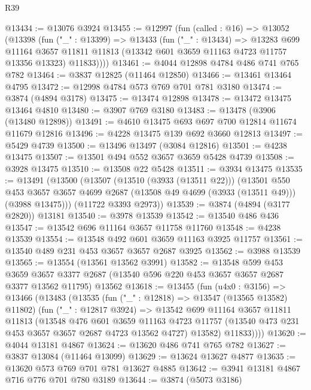 \begin{lexlean}{R39}
\begin{coremodule}
@13434 := @13076 @3924
@13455 := @12997
    (fun (called : @16) =>
    @13052
      (@13398
        (fun ("_" : @13399) =>
        @13433
          (fun ("_" : @13434) =>
          @13283
            @699
            @11164
            @3657
            @11811
            @11813
            (@13342 @601 @3659 @11163 @4723 @11757 @13356 @13323)
            @11833))))
@13461 := @4044 @12898 @4784 @486 @741 @765 @782
@13464 := @3837 @12825 (@11464 @12850)
@13466 := @13461 @13464 @4795
@13472 := @12998 @4784 @573 @769 @701 @781 @3180
@13474 := @3874 (@4894 @3178)
@13475 := @13474 @12898
@13478 := @13472 @13475 @13464 @4810
@13480 := @3907 @769 @3180
@13483 := @13478 (@3906 (@13480 @12898))
@13491 := @4610 @13475 @693 @697 @700 @12814 @11674 @11679 @12816
@13496 := @4228 @13475 @139 @692 @3660 @12813
@13497 := @5429 @4739
@13500 := @13496 @13497 (@3084 @12816)
@13501 := @4238 @13475
@13507 := @13501 @494 @552 @3657 @3659 @5428 @4739
@13508 := @3928 @13475
@13510 := @13508 @22 @5428
@13511 := @3934 @13475
@13535 := @13491
    (@13500
      (@13507
        (@13510 (@3933 (@13511 @22)))
        (@13501
          @550
          @453
          @3657
          @3657
          @4699
          @2687
          (@13508 @49 @4699 (@3933 (@13511 @49)))
          (@3988 @13475)))
      (@11722 @3393 @2973))
@13539 := @3874 (@4894 (@3177 @2820)) @13181
@13540 := @3978 @13539
@13542 := @13540 @486 @436
@13547 := @13542 @696 @11164 @3657 @11758 @11760
@13548 := @4238 @13539
@13554 := @13548 @492 @601 @3659 @11163 @3925 @11757
@13561 := @13540 @489 @231 @453 @3657 @3657 @2687 @3925
@13562 := @3988 @13539
@13565 := @13554 (@13561 @13562 @3991)
@13582 := @13548
    @599
    @453
    @3659
    @3657
    @3377
    @2687
    (@13540 @596 @220 @453 @3657 @3657 @2687 @3377 @13562 @11795)
    @13562
@13618 := @13455
    (fun (u4x0 : @3156) =>
    @13466
      (@13483
        (@13535
          (fun ("_" : @12818) => @13547 (@13565 @13582) @11802)
          (fun ("_" : @12817 @3924) =>
          @13542
            @699
            @11164
            @3657
            @11811
            @11813
            (@13548
              @476
              @601
              @3659
              @11163
              @4723
              @11757
              (@13540 @473 @231 @453 @3657 @3657 @2687 @4723 @13562 @4727)
              @13582)
            @11833))))
@13620 := @4044 @13181 @4867
@13624 := @13620 @486 @741 @765 @782
@13627 := @3837 @13084 (@11464 @13099)
@13629 := @13624 @13627 @4877
@13635 := @13620 @573 @769 @701 @781 @13627 @4885
@13642 := @3941 @13181 @4867 @716 @776 @701 @780 @3189
@13644 := @3874 (@5073 @3186)

\end{coremodule}
\end{lexlean}
